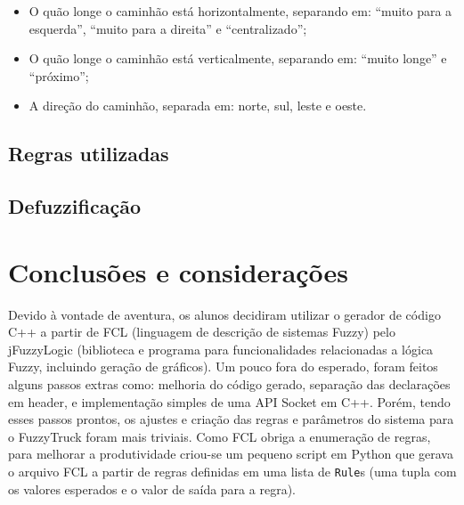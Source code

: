 \documentclass[twocolumn]{article}
\begin{document}
    \begin{itemize}
        \item O quão longe o caminhão está horizontalmente, separando em:
            ``muito para a esquerda'', ``muito para a direita'' e
            ``centralizado'';
        \item O quão longe o caminhão está verticalmente, separando em: ``muito
            longe'' e ``próximo'';
        \item A direção do caminhão, separada em: norte, sul, leste e oeste.
    \end{itemize}

    \subsection{Regras utilizadas}

    \subsection{Defuzzificação}

    \section{Conclusões e considerações}

    Devido à vontade de aventura, os alunos decidiram utilizar o gerador de
    código C++ a partir de FCL (linguagem de descrição de sistemas Fuzzy) pelo
    jFuzzyLogic (biblioteca e programa para funcionalidades relacionadas a
    lógica Fuzzy, incluindo geração de gráficos). Um pouco fora do esperado,
    foram feitos alguns passos extras como: melhoria do código gerado,
    separação das declarações em header, e implementação simples de uma API
    Socket em C++. Porém, tendo esses passos prontos, os ajustes e criação das
    regras e parâmetros do sistema para o FuzzyTruck foram mais triviais. Como
    FCL obriga a enumeração de regras, para melhorar a produtividade criou-se
    um pequeno script em Python que gerava o arquivo FCL a partir de regras
    definidas em uma lista de \texttt{Rule}s (uma tupla com os valores
    esperados e o valor de saída para a regra).
\end{document}
